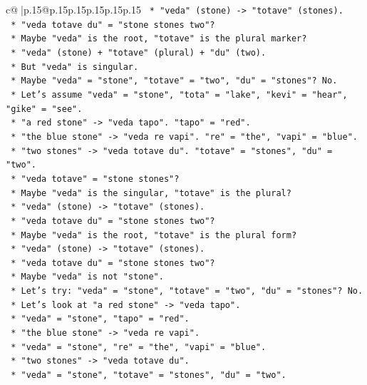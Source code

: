 \documentclass{article}
\begin{document}
{\begin{supertabular}{c@{$\;$}|p{.15\linewidth}@{}p{.15\linewidth}p{.15\linewidth}p{.15\linewidth}p{.15\linewidth}p{.15\linewidth}}
{{{\texttt{    *   "veda" (stone) {-}> "totave" (stones).} \\
\texttt{    *   "veda totave du" = "stone stones two"?} \\
\texttt{    *   Maybe "veda" is the root, "totave" is the plural marker?} \\
\texttt{    *   "veda" (stone) + "totave" (plural) + "du" (two).} \\
\texttt{    *   But "veda" is singular.} \\
\texttt{    *   Maybe "veda" = "stone", "totave" = "two", "du" = "stones"? No.} \\
\texttt{    *   Let's assume "veda" = "stone", "tota" = "lake", "kevi" = "hear", "gike" = "see".} \\
\texttt{    *   "a red stone" {-}> "veda tapo". "tapo" = "red".} \\
\texttt{    *   "the blue stone" {-}> "veda re vapi". "re" = "the", "vapi" = "blue".} \\
\texttt{    *   "two stones" {-}> "veda totave du". "totave" = "stones", "du" = "two".} \\
\texttt{    *   "veda totave" = "stone stones"?} \\
\texttt{    *   Maybe "veda" is the singular, "totave" is the plural?} \\
\texttt{    *   "veda" (stone) {-}> "totave" (stones).} \\
\texttt{    *   "veda totave du" = "stone stones two"?} \\
\texttt{    *   Maybe "veda" is the root, "totave" is the plural form?} \\
\texttt{    *   "veda" (stone) {-}> "totave" (stones).} \\
\texttt{    *   "veda totave du" = "stone stones two"?} \\
\texttt{    *   Maybe "veda" is not "stone".} \\
\texttt{    *   Let's try: "veda" = "stone", "totave" = "two", "du" = "stones"? No.} \\
\texttt{    *   Let's look at "a red stone" {-}> "veda tapo".} \\
\texttt{    *   "veda" = "stone", "tapo" = "red".} \\
\texttt{    *   "the blue stone" {-}> "veda re vapi".} \\
\texttt{    *   "veda" = "stone", "re" = "the", "vapi" = "blue".} \\
\texttt{    *   "two stones" {-}> "veda totave du".} \\
\texttt{    *   "veda" = "stone", "totave" = "stones", "du" = "two".} \\
}}}
\end{supertabular}}
\end{document}
